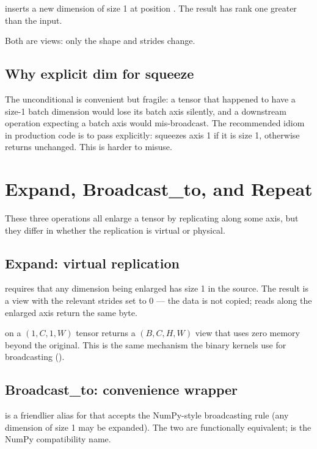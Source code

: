  inserts a new dimension of size 1 at
position . The result has rank one greater than the
input.

Both are views: only the shape and strides change.

\subsection{Why explicit dim for squeeze}
\label{ssec:shape_view:explicit_dim}

The unconditional  is convenient but fragile:
a tensor that happened to have a size-1 batch dimension would
lose its batch axis silently, and a downstream operation
expecting a batch axis would mis-broadcast. The recommended idiom
in production code is to pass  explicitly:
 squeezes axis 1 if it is size 1, otherwise
returns  unchanged. This is harder to misuse.

\section{Expand, Broadcast\_to, and Repeat}
\label{sec:shape_view:expand}

These three operations all enlarge a tensor by replicating along
some axis, but they differ in whether the replication is virtual
or physical.

\subsection{Expand: virtual replication}
\label{ssec:shape_view:expand_virtual}

 requires that any dimension being
enlarged has size 1 in the source. The result is a view with the
relevant strides set to 0 --- the data is not copied; reads along
the enlarged axis return the same byte.

 on a $(1, C, 1, W)$ tensor returns a
$(B, C, H, W)$ view that uses zero memory beyond the original.
This is the same mechanism the binary kernels use for broadcasting
().

\subsection{Broadcast\_to: convenience wrapper}
\label{ssec:shape_view:broadcast_to}

 is a friendlier alias for
 that accepts the NumPy-style broadcasting rule (any
dimension of size 1 may be expanded). The two are functionally
equivalent;  is the NumPy compatibility name.

